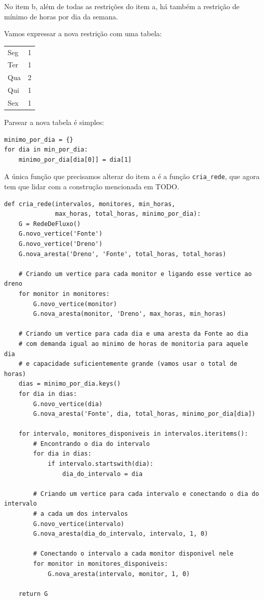 \documentclass[11pt]{article}
\begin{document}
No item b, além de todas as restrições do item a, há também a
restrição de mínimo de horas por dia da semana.

Vamos expressar a nova restrição com uma tabela:

\begin{center}
\begin{tabular}{lr}
Seg & 1\\
Ter & 1\\
Qua & 2\\
Qui & 1\\
Sex & 1\\
\end{tabular}
\end{center}

Parsear a nova tabela é simples:
\begin{verbatim}
minimo_por_dia = {}
for dia in min_por_dia:
    minimo_por_dia[dia[0]] = dia[1]
\end{verbatim}

A única função que precisamos alterar do item a é a função
\verb~cria_rede~, que agora tem que lidar com a construção mencionada em TODO.

\begin{verbatim}
def cria_rede(intervalos, monitores, min_horas,
              max_horas, total_horas, minimo_por_dia):
    G = RedeDeFluxo()
    G.novo_vertice('Fonte')
    G.novo_vertice('Dreno')
    G.nova_aresta('Dreno', 'Fonte', total_horas, total_horas)

    # Criando um vertice para cada monitor e ligando esse vertice ao dreno
    for monitor in monitores:
        G.novo_vertice(monitor)
        G.nova_aresta(monitor, 'Dreno', max_horas, min_horas)

    # Criando um vertice para cada dia e uma aresta da Fonte ao dia
    # com demanda igual ao minimo de horas de monitoria para aquele dia
    # e capacidade suficientemente grande (vamos usar o total de horas)
    dias = minimo_por_dia.keys()
    for dia in dias:
        G.novo_vertice(dia)
        G.nova_aresta('Fonte', dia, total_horas, minimo_por_dia[dia])

    for intervalo, monitores_disponiveis in intervalos.iteritems():
        # Encontrando o dia do intervalo
        for dia in dias:
            if intervalo.startswith(dia):
                dia_do_intervalo = dia

        # Criando um vertice para cada intervalo e conectando o dia do intervalo
        # a cada um dos intervalos
        G.novo_vertice(intervalo)
        G.nova_aresta(dia_do_intervalo, intervalo, 1, 0)

        # Conectando o intervalo a cada monitor disponivel nele
        for monitor in monitores_disponiveis:
            G.nova_aresta(intervalo, monitor, 1, 0)

    return G
\end{verbatim}
\end{document}
